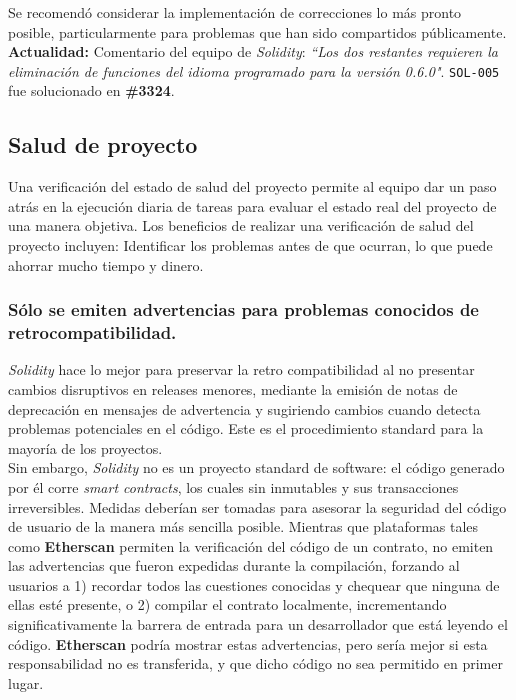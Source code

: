 Se recomendó considerar la implementación de correcciones lo más pronto posible, particularmente para problemas que han sido compartidos públicamente.\\

\textbf{Actualidad:} Comentario del equipo de \textit{Solidity}: \textit{``Los dos restantes requieren la eliminación de funciones del idioma programado para la versión 0.6.0"}. \texttt{SOL-005} fue solucionado en \textbf{\#3324}.\\

\subsection{Salud de proyecto}
Una verificación del estado de salud del proyecto permite al equipo dar un paso atrás en la ejecución diaria de tareas para evaluar el estado real del proyecto de una manera objetiva. Los beneficios de realizar una verificación de salud del proyecto incluyen: Identificar los problemas antes de que ocurran, lo que puede ahorrar mucho tiempo y dinero.


\subsubsection{Sólo se emiten advertencias para problemas conocidos de retrocompatibilidad.}
\textit{Solidity} hace lo mejor para preservar la retro compatibilidad al no presentar cambios disruptivos en releases menores, mediante la emisión de notas de deprecación en mensajes de advertencia y sugiriendo cambios cuando detecta problemas potenciales en el código. Este es el procedimiento standard para la mayoría de los proyectos.\\

Sin embargo, \textit{Solidity} no es un proyecto standard de software: el código generado por él corre \textit{smart contracts}, los cuales sin inmutables y sus transacciones irreversibles. Medidas deberían ser tomadas para asesorar la seguridad del código de usuario de la manera más sencilla posible. Mientras que plataformas tales como \textbf{Etherscan} permiten la verificación del código de un contrato, no emiten las advertencias que fueron expedidas durante la compilación, forzando al usuarios a 1) recordar todos las cuestiones conocidas y chequear que ninguna de ellas esté presente, o 2) compilar el contrato localmente, incrementando significativamente la barrera de entrada para un desarrollador que está leyendo el código. \textbf{Etherscan} podría mostrar estas advertencias, pero sería mejor si esta responsabilidad no es transferida, y que dicho código no sea permitido en primer lugar.\\

